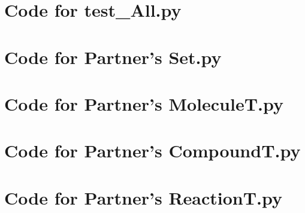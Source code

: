 \documentclass[12pt]{article}
\begin{document}
\noindent 

\newpage

\section{Code for test\_All.py}

\noindent 

\newpage

\section{Code for Partner's Set.py}

\noindent 

\newpage

\section{Code for Partner's MoleculeT.py}

\noindent 

\newpage

\section{Code for Partner's CompoundT.py}

\noindent 

\newpage

\section{Code for Partner's ReactionT.py}

\noindent 
\end{document}
